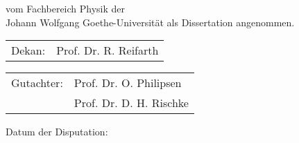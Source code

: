 \thispagestyle{empty}

\vspace*{0.5\textheight}

\noindent{}%
vom Fachbereich Physik der \\[2pt]
Johann Wolfgang Goethe-Universit\"at als Dissertation angenommen.

\vspace*{2cm}

\noindent{}%
\begin{tabular}{@{}l@{\hskip 1ex}l}
  Dekan: & Prof. Dr. R. Reifarth
\end{tabular}

\vspace*{1cm}

\noindent{}%
\begin{tabular}{@{}l@{\hskip 1ex}l}
  Gutachter: & Prof. Dr. O. Philipsen\\
             & Prof. Dr. D. H. Rischke
\end{tabular}

\vspace*{2cm}
\noindent{}%
Datum der Disputation:
